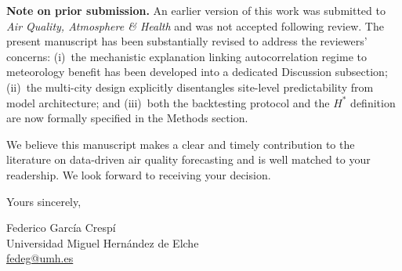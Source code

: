 \documentclass[12pt,a4paper]{article}
\begin{document}

\textbf{Note on prior submission.}
An earlier version of this work was submitted to \textit{Air Quality,
Atmosphere \& Health} and was not accepted following review.  The present
manuscript has been substantially revised to address the reviewers' concerns:
(i)~the mechanistic explanation linking autocorrelation regime to meteorology
benefit has been developed into a dedicated Discussion subsection; (ii)~the
multi-city design explicitly disentangles site-level predictability from model
architecture; and (iii)~both the backtesting protocol and the $H^*$ definition
are now formally specified in the Methods section.


We believe this manuscript makes a clear and timely contribution to the
literature on data-driven air quality forecasting and is well matched to your
readership.  We look forward to receiving your decision.

\bigskip

Yours sincerely,

\bigskip\bigskip

\noindent
Federico García Crespí\\
Universidad Miguel Hernández de Elche\\
\href{mailto:fedeg@umh.es}{fedeg@umh.es}
\end{document}
